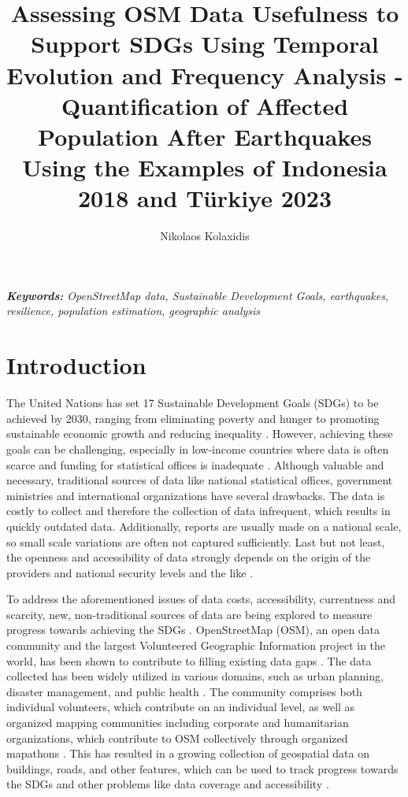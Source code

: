 \documentclass[oneside,twocolumn,10pt,cleanfoot,cleanhead]{asme2ej}
\title{
    Assessing OSM Data Usefulness to Support SDGs Using Temporal Evolution and Frequency Analysis -\newline
    Quantification of Affected Population After Earthquakes Using the Examples of Indonesia 2018 and Türkiye 2023 
}
\author{Nikolaos Kolaxidis
    \affiliation{
	M.Sc. Geography\\
    pd281@uni-heidelberg.de\\
    Heidelberg University\\
    15.05.2023
    }	
}
\begin{document}
\maketitle


\textit{
    \textbf{Keywords:} OpenStreetMap data, Sustainable Development Goals, earthquakes, resilience, population estimation, geographic analysis
}


\section{Introduction}

The United Nations has set 17 Sustainable Development Goals (SDGs) to be achieved by 2030, ranging from eliminating poverty and hunger to promoting sustainable economic growth and reducing inequality \cite{YouthMappers2023}. 
However, achieving these goals can be challenging, especially in low-income countries where data is often scarce and funding for statistical offices is inadequate \cite{OCHA2023}. 
Although valuable and necessary, traditional sources of data like national statistical offices, government ministries and international organizations have several drawbacks.
The data is costly to collect and therefore the collection of data infrequent, which results in quickly outdated data.
Additionally, reports are usually made on a national scale, so small scale variations are often not captured sufficiently. 
Last but not least, the openness and accessibility of data strongly depends on the origin of the providers and national security levels and the like \cite{FritzEA2019}.

To address the aforementioned issues of data costs, accessibility, currentness and scarcity, new, non-traditional sources of data are being explored to measure progress towards achieving the SDGs \cite{FritzEA2019, SunEA2020}.
OpenStreetMap (OSM), an open data community and the largest Volunteered Geographic Information project in the world, has been shown to contribute to filling existing data gaps \cite{AndersonEA2019, BarronEA2014}.
The data collected has been widely utilized in various domains, such as urban planning, disaster management, and public health \cite{FritzEA2019, HerfortEA2021, ScholzEA2018}.
The community comprises both individual volunteers, which contribute on an individual level, as well as organized mapping communities including corporate and humanitarian organizations, which contribute to OSM collectively through organized mapathons \cite{AndersonEA2019}. 
This has resulted in a growing collection of geospatial data on buildings, roads, and other features, which can be used to track progress towards the SDGs and other problems like data coverage and accessibility \cite{YouthMappers2023}.
\end{document}
